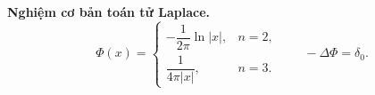\textbf{Nghiệm cơ bản toán tử Laplace.}
$$\Phi(x)=\begin{cases}-\dfrac{1}{2\pi}\ln|x|, & n=2,\\[6pt] \dfrac{1}{4\pi|x|}, & n=3.\end{cases}
\qquad -\Delta\Phi=\delta_0.$$
